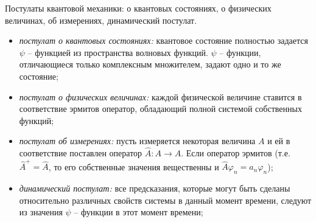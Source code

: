 \documentclass[__main__.tex]{subfiles}
\begin{document}
Постулаты квантовой механики: о квантовых состояниях, о физических величинах, об измерениях, динамический постулат.\\ 

\begin{itemize}
\item
\textit{постулат о квантовых состояниях:} квантовое состояние полностью задается $\psi$ -- функцией из пространства волновых функций. $\psi$ -- функции, отличающиеся только комплексным множителем, задают одно и то же состояние;
\item
\textit{постулат о физических величинах:} каждой физической величине ставится в соответствие эрмитов оператор, обладающий полной системой собственных функций;
\item
\textit{постулат об измерениях:} пусть измеряется некоторая величина $A$ и ей в соответствие поставлен оператор $\hat{A}: A \rightarrow \hat{A}$. Если оператор эрмитов (т.е. $\hat{A}^{+}=\hat{A}$, то его собственные значения вещественны и $\hat{A}\varphi_n=a_n\varphi_n$);
\item
\textit{динамический постулат:} все предсказания, которые могут быть сделаны относительно различных свойств системы в данный момент времени, следуют из значения $\psi$ -- функции в этот момент времени;
\end{itemize}
\end{document}
